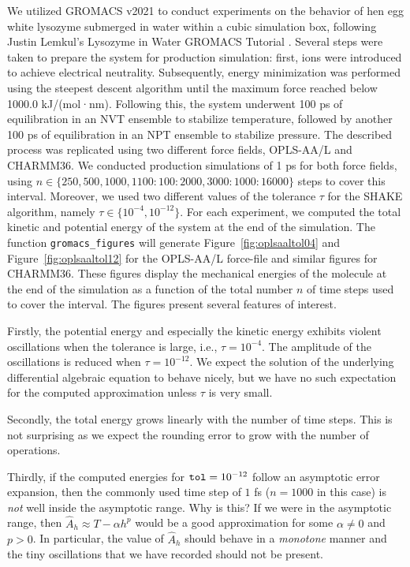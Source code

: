 \documentclass[runningheads]{llncs}
\begin{document}
We utilized GROMACS v2021 to conduct experiments on the behavior of hen egg white lysozyme submerged in water within a cubic simulation box, following Justin Lemkul's Lysozyme in Water GROMACS Tutorial \cite{lemkul2019from}. Several steps were taken to prepare the system for production simulation: first, ions were introduced to achieve electrical neutrality. Subsequently, energy minimization was performed using the steepest descent algorithm until the maximum force reached below 1000.0 kJ/(mol·nm). Following this, the system underwent 100 ps of equilibration in an NVT ensemble to stabilize temperature, followed by another 100 ps of equilibration in an NPT ensemble to stabilize pressure. The described process was replicated using two different force fields, OPLS-AA/L and CHARMM36. We conducted production simulations of 1 ps for both force fields, using $n \in \{250, 500, 1000, 1100:100:2000, 3000:1000:16000 \}$ steps to cover this interval.
Moreover, we used two different values of the tolerance $\tau$ for the SHAKE algorithm, namely $\tau \in \{10^{-4}, 10^{-12}\}$. 
For each experiment, we computed the total kinetic and potential energy of the system at the end of the simulation.
The function {\tt gromacs\_figures} will generate Figure~\ref{fig:oplsaaltol04} and Figure~\ref{fig:oplsaaltol12} for the OPLS-AA/L force-file and similar figures for CHARMM36. These figures display the mechanical energies of the molecule at the end of the simulation as a function of the total number $n$ of time steps used to cover the interval. The figures present several features of interest.

Firstly, the potential energy and especially the kinetic energy exhibits violent oscillations when the tolerance is large, i.e., $\tau = 10^{-4}$. The amplitude of the oscillations is reduced when $\tau = 10^{-12}$. We expect the solution of the underlying differential algebraic equation to behave nicely, but we have no such expectation for the computed approximation unless $\tau$ is very small. 

Secondly, the total energy grows linearly with the number of time steps. This is not surprising as we expect the rounding error to grow with the number of operations.

Thirdly, if the computed energies for ${\tt tol} = 10 ^{-12}$ follow an asymptotic error expansion, then the commonly used time step of $1$ fs ($n=1000$ in this case) is \emph{not} well inside the asymptotic range. Why is this? If we were in the asymptotic range, then $\hat{A}_h \approx T - \alpha h^p$ would be a good approximation for some $\alpha \not = 0$ and $p>0$. In particular, the value of $\hat{A}_h$ should behave in a \emph{monotone} manner and the tiny oscillations that we have recorded should not be present.
\end{document}
